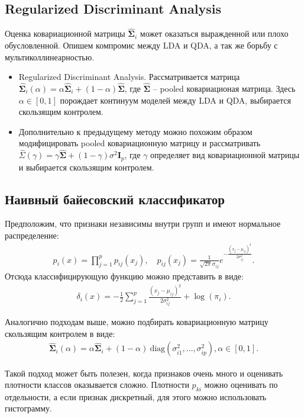\documentclass{article}
\begin{document}
	\subsection{Regularized Discriminant Analysis}
	Оценка ковариационной матрицы $\widehat{\mathbf{\Sigma}}_i$ может оказаться выражденной или плохо обусловленной. Опишем компромис между LDA и QDA, а так же борьбу с мультиколлинеарностью.
	\begin{itemize}
		\item Regularized Discriminant Analysis. Рассматривается матрица $\widehat{\mathbf{\Sigma}}_i(\alpha) = \alpha \widehat{\mathbf{\Sigma}}_i + (1 - \alpha)\widehat{\mathbf{\Sigma}}$, где $\widehat{\mathbf{\Sigma}}$ -- pooled ковариационая матрица. Здесь $\alpha \in [0, 1]$ порождает континуум моделей между LDA и QDA, выбирается скользящим контролем.
		\item Дополнительно к предыдущему методу можно похожим образом модифицировать pooled ковариационную матрицу и рассматривать $\widehat{\Sigma}(\gamma) = \gamma \widehat{\mathbf{\Sigma}} + (1 - \gamma)\sigma^2 \mathbf{I}_p$, где $\gamma$ определяет вид ковариационной матрицы и выбирается скользящим контролем.
	\end{itemize}
	
	\subsection{Наивный байесовский классификатор}
	Предположим, что признаки независимы внутри групп и имеют нормальное распределение:
	\begin{align*}
		p_i(x) = \prod_{j = 1}^p p_{ij}(x_j), \quad p_{ij}(x_j) = \frac{1}{\sqrt{2\pi}\sigma_{ij}}e^{-\frac{(x_j -\mu_{ij})^2}{2\sigma^2_{ij}}}.
	\end{align*}
	Отсюда классифицирующую функцию можно представить в виде:
	\begin{align*}
		\delta_i(x) = -\frac{1}{2}\sum_{j = 1}^p\frac{(x_j -\mu_{ij})^2}{2\sigma^2_{ij}} + \log(\pi_i).
	\end{align*}
	
	Аналогично подходам выше, можно подбирать ковариационную матрицу скользящим контролем в виде:
	\begin{align*}
		\widehat{\mathbf{\Sigma}}_i(\alpha) = \alpha \widehat{\mathbf{\Sigma}}_i + (1 - \alpha)~\mathrm{diag}(\sigma^2_{i1}, \ldots, \sigma^2_{ip}), \alpha \in [0,1].
	\end{align*}
	
	Такой подход может быть полезен, когда признаков очень много и оценивать плотности классов оказывается сложно. Плотности $p_{ki}$ можно оценивать по отдельности, а если признак дискретный, для этого можно использовать гистограмму.
	
\end{document}
